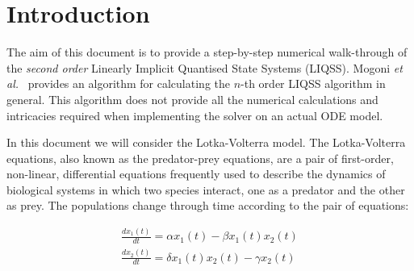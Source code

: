 \documentclass[10pt]{article}
\begin{document}
\newcommand{\bottomline}{\arrayrulecolor{white}\specialrule{\aboverulesep}{0pt}{0pt}%
	\arrayrulecolor{black}\specialrule{\heavyrulewidth}{0pt}{\belowbottomsep}}%

\newcommand{\bottomlinec}{\arrayrulecolor{tablerowcolor}\specialrule{\aboverulesep}{0pt}{0pt}%
	\arrayrulecolor{black}\specialrule{\heavyrulewidth}{0pt}{\belowbottomsep}}%

\newcommand{\bottomlinect}{\arrayrulecolor{tableheadcolor}\specialrule{\aboverulesep}{0pt}{0pt}%
	\arrayrulecolor{black}\specialrule{\heavyrulewidth}{0pt}{\belowbottomsep}}%



\maketitle



\pagestyle{myheadings}

\section{Introduction}

The aim of this document is to provide a step-by-step numerical walk-through of the {\em second order} Linearly Implicit Quantised State Systems (LIQSS). Mogoni {\em et al.}~\cite{MigoniBortolottoKofmanCellier2013} provides an algorithm for calculating the $n$-th order LIQSS algorithm in general. This algorithm does not provide all the numerical calculations and intricacies required when implementing the solver on an actual ODE model.

In this document we will consider the Lotka-Volterra model. The Lotka-Volterra equations, also known as the predator-prey equations, are a pair of first-order, non-linear, differential equations frequently used to describe the dynamics of biological systems in which two species interact, one as a predator and the other as prey. The populations change through time according to the pair of equations:

\begin{align*}
\frac{dx_1(t)}{dt}  = \alpha x_1(t) - \beta x_1(t) x_2(t) \\[6pt]
\frac{dx_2(t)}{dt}  = \delta x_1(t) x_2(t)  - \gamma x_2(t)
\end{align*}
\end{document}
